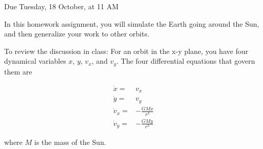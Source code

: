 \documentclass[12pt]{article}
\begin{document}
\Large
\centerline{}
\centerline{Due Tuesday, 18 October, at 11 AM}
\normalsize

In this homework assignment, you will simulate the Earth going around the Sun,
and then generalize your work to other orbits.

To review the discussion in class: 
For an orbit in the x-y plane, you have four dynamical variables $x$, $y$,
$v_x$, and $v_y$. The four differential equations that govern them are

\begin{align}
\dot x =& v_x\\
\dot y =& v_y\\
\dot v_x =& -\frac{GMx}{r^3} \\
\dot v_y =& -\frac{GMy}{r^3} 
\end{align}

where $M$ is the mass of the Sun.
\end{document}
